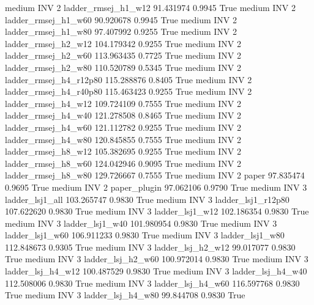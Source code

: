     medium      INV                 2    ladder_rmsej_h1_w12  91.431974      0.9945    True
    medium      INV                 2    ladder_rmsej_h1_w60  90.920678      0.9945    True
    medium      INV                 2    ladder_rmsej_h1_w80  97.407992      0.9255    True
    medium      INV                 2    ladder_rmsej_h2_w12 104.179342      0.9255    True
    medium      INV                 2    ladder_rmsej_h2_w60 113.963435      0.7725    True
    medium      INV                 2    ladder_rmsej_h2_w80 110.520789      0.5345    True
    medium      INV                 2 ladder_rmsej_h4_r12p80 115.288876      0.8405    True
    medium      INV                 2 ladder_rmsej_h4_r40p80 115.463423      0.9255    True
    medium      INV                 2    ladder_rmsej_h4_w12 109.724109      0.7555    True
    medium      INV                 2    ladder_rmsej_h4_w40 121.278508      0.8465    True
    medium      INV                 2    ladder_rmsej_h4_w60 121.112782      0.9255    True
    medium      INV                 2    ladder_rmsej_h4_w80 120.845855      0.7555    True
    medium      INV                 2    ladder_rmsej_h8_w12 105.382695      0.9255    True
    medium      INV                 2    ladder_rmsej_h8_w60 124.042946      0.9095    True
    medium      INV                 2    ladder_rmsej_h8_w80 129.726667      0.7555    True
    medium      INV                 2                  paper  97.835474      0.9695    True
    medium      INV                 2           paper_plugin  97.062106      0.9790    True
    medium      INV                 3        ladder_lsj1_all 103.265747      0.9830    True
    medium      INV                 3     ladder_lsj1_r12p80 107.622620      0.9830    True
    medium      INV                 3        ladder_lsj1_w12 102.186354      0.9830    True
    medium      INV                 3        ladder_lsj1_w40 101.980954      0.9830    True
    medium      INV                 3        ladder_lsj1_w60 106.911233      0.9830    True
    medium      INV                 3        ladder_lsj1_w80 112.848673      0.9305    True
    medium      INV                 3      ladder_lsj_h2_w12  99.017077      0.9830    True
    medium      INV                 3      ladder_lsj_h2_w60 100.972014      0.9830    True
    medium      INV                 3      ladder_lsj_h4_w12 100.487529      0.9830    True
    medium      INV                 3      ladder_lsj_h4_w40 112.508006      0.9830    True
    medium      INV                 3      ladder_lsj_h4_w60 116.597768      0.9830    True
    medium      INV                 3      ladder_lsj_h4_w80  99.844708      0.9830    True
